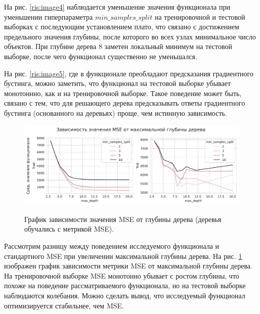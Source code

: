 \documentclass{article}
\begin{document}
На рис. \ref{ris:image4} наблюдается уменьшение значения функционала при уменьшении гиперпараметра $min\_samples\_split$ на тренировочной и тестовой выборках с последующим установлением плато, что связано с достижением предельного значения глубины, после которого во всех узлах минимальное число объектов. При глубине дерева 8 заметен локальный минимум на тестовой выборке, после чего функционал существенно не уменьшался.


На рис. \ref{ris:image5}, где в функционале преобладают предсказания градиентного бустинга, можно заметить, что функционал на тестовой выборке убывает монотоннно, как и на тренировочной выборке. Такое поведение может быть, связано с тем, что для решающего дерева предсказывать ответы градиентного бустинга (основанного на деревьях) проще, чем истинную зависимость.



\begin{figure}[h]
	\begin{center}
		\begin{minipage}[h]{1\linewidth}
			{\includegraphics[width=1.0\linewidth]{../figures/task1_common_mse.pdf}}	
		\end{minipage}
	\end{center}
	
	\caption{График зависимости значения MSE от глубины дерева (деревья обучались с метрикой MSE). }
	\label{ris:image6}
\end{figure}

Рассмотрим разницу между поведением исследуемого функционала и стандартного MSE при увеличении максимальной глубины дерева. На рис. \ref{ris:image6} изображен график зависимости метрики MSE от максимальной глубины дерева. На тренировочной выборке MSE монотонно убывает с ростом глубины, что похоже на поведение рассматриваемого функционала, но на тестовой выборке наблюдаются колебания. Можно сделать вывод, что исследуемый функционал оптимизируется стабильнее, чем MSE.
\end{document}
